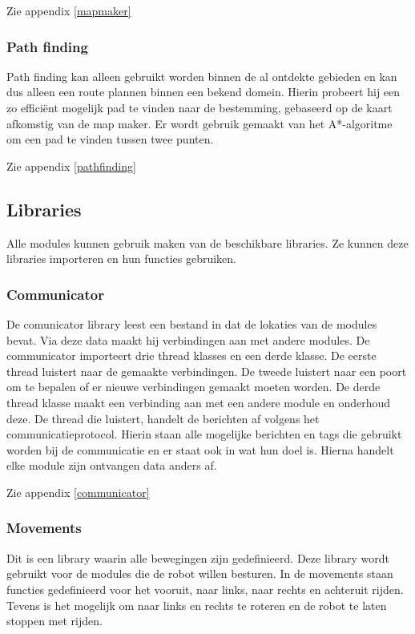 \documentclass[a4paper,10pt]{article}
\begin{document}
Zie appendix \ref{mapmaker}

\subsubsection{Path finding}
Path finding kan alleen gebruikt worden binnen de al ontdekte gebieden en kan dus alleen een route plannen binnen een bekend domein. Hierin probeert hij een zo effici\"{e}nt mogelijk pad te vinden naar de bestemming, gebaseerd op de kaart afkomstig van de map maker. Er wordt gebruik gemaakt van het A*-algoritme\cite{Aster2,Aster:tutorial} om een pad te vinden tussen twee punten.

Zie appendix \ref{pathfinding}

\subsection{Libraries}
Alle modules kunnen gebruik maken van de beschikbare libraries. Ze kunnen deze libraries importeren en hun functies gebruiken.

\subsubsection{Communicator}
De comunicator library leest een bestand in dat de lokaties van de modules bevat. Via deze data maakt hij verbindingen aan met andere modules. De communicator importeert drie thread klasses en een derde klasse. De eerste thread luistert naar de gemaakte verbindingen. De tweede luistert naar een poort om te bepalen of er nieuwe verbindingen gemaakt moeten worden. De derde thread klasse maakt een verbinding aan met een andere module en onderhoud deze. De thread die luistert, handelt de berichten af volgens het communicatieprotocol. Hierin staan alle mogelijke berichten en tags die gebruikt worden bij de communicatie en er staat ook in wat hun doel is. Hierna handelt elke module zijn ontvangen data anders af.

Zie appendix \ref{communicator}

\subsubsection{Movements}
Dit is een library waarin alle bewegingen zijn gedefinieerd. Deze library wordt gebruikt voor de modules die de robot willen besturen. In de movements staan functies gedefinieerd voor het vooruit, naar links, naar rechts en achteruit rijden. Tevens is het mogelijk om naar links en rechts te roteren en de robot te laten stoppen met rijden.
\end{document}
